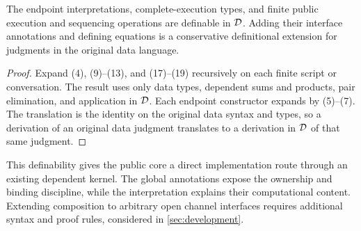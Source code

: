 \begin{proposition}
\label{prop:definability}
The endpoint interpretations, complete-execution types, and finite public
execution and sequencing operations are definable in $\mathcal D$. Adding their
interface annotations and defining equations is a conservative definitional
extension for judgments in the original data language.
\end{proposition}
\begin{proof}
Expand (4), (9)--(13), and (17)--(19) recursively on each finite script or
conversation. The result uses only data types, dependent sums and products,
pair elimination, and application in $\mathcal D$. Each endpoint constructor expands
by (5)--(7). The translation is the identity on the original data syntax and
types, so a derivation of an original data judgment translates to a derivation
in $\mathcal D$ of that same judgment.
\end{proof}

This definability gives the public core a direct implementation route through
an existing dependent kernel. The global annotations expose the ownership and
binding discipline, while the interpretation explains their computational
content. Extending composition to arbitrary open channel interfaces requires
additional syntax and proof rules, considered in \cref{sec:development}.
